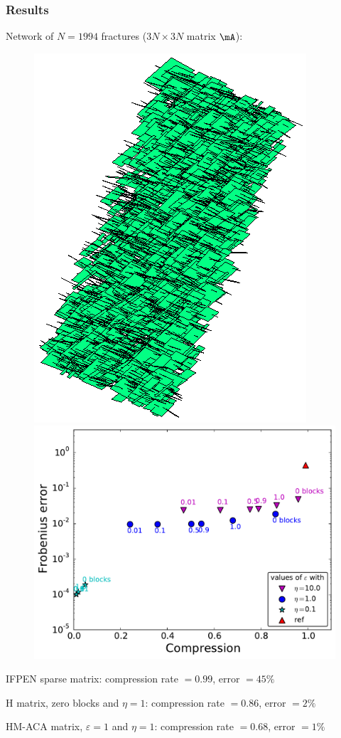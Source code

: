 \begin{frame}
\frametitle{Results}

\small

Network of $N=1994$ \alert{fractures} ($3N\times 3N$ matrix $\mA$):
\vspace{-5pt}
\begin{figure}
\centering
\includegraphics[width=.3\textwidth]{../images/visu_maillage1994Fracs.png}
\includegraphics[width=.6\textwidth]{../images/graphe_compasparse_output_compression_18_08_2016matrice1994Fracs.pdf}
\end{figure}

\vspace{-5pt}
{\footnotesize
IFPEN sparse matrix: compression rate $=0.99$, error \alert{$=45\%$}

H matrix, zero blocks and $\eta=1$: compression rate $=0.86$, error $=2\%$

HM-ACA matrix, $\varepsilon=1$ and $\eta=1$: compression rate $=0.68$, error \alert{$=1\%$}
}

\end{frame}



